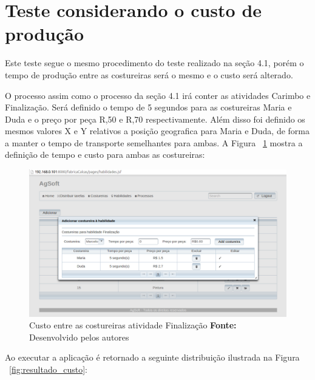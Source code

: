 \section{Teste considerando o custo de produção}

\par Este teste segue o mesmo procedimento do teste realizado na seção 4.1,
porém o tempo de produção entre as costureiras será o mesmo e o custo será
alterado.

\par O processo assim como o processo da seção 4.1 irá conter as atividades
Carimbo e Finalização. 
Será definido o tempo de 5 segundos para as costureiras Maria e Duda e o preço por 
peça R,50 e R,70 respectivamente. Além disso foi definido os mesmos valores X e Y  
relativos a posição geografica para Maria e Duda, de forma a manter o tempo de
transporte semelhantes para ambas. A Figura
~\ref{fig:custo_entre_costureiras} mostra a definição de tempo e custo para
ambas as costureiras:



\begin{figure}[h!]
	\centerline{\includegraphics[scale=0.4]{./imagens/custo_entre_costureiras_teste2.png}}
	\caption[Custo entre as costureiras atividade Finalização]
	{Custo entre as costureiras atividade Finalização \textbf{Fonte:} Desenvolvido pelos autores}
	\label{fig:custo_entre_costureiras}
\end{figure}



\par Ao executar a aplicação é retornado a seguinte distribuição ilustrada na
Figura ~\ref{fig:resultado_custo}:

\newpage

